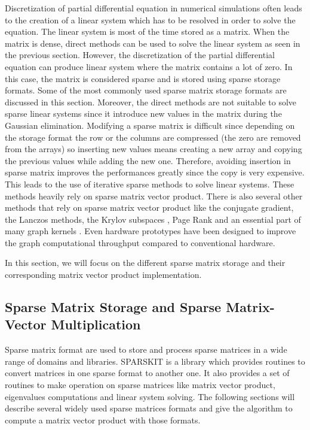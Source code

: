 Discretization of partial differential equation in numerical simulations often leads to the creation of a linear system which has to be resolved in order to solve the equation.
The linear system is most of the time stored as a matrix.
When the matrix is dense, direct methods can be used to solve the linear system as seen in the previous section.
However, the discretization of the partial differential equation can produce linear system where the matrix contains a lot of zero.
In this case, the matrix is considered sparse and is stored using sparse storage formats.
Some of the most commonly used sparse matrix storage formats are discussed in this section.
Moreover, the direct methods are not suitable to solve sparse linear systems since it introduce new values in the matrix during the Gaussian elimination.
Modifying a sparse matrix is difficult since depending on the storage format the row or the columns are compressed (the zero are removed from the arrays) so inserting new values means creating a new array and copying the previous values while adding the new one.
Therefore, avoiding insertion in sparse matrix improves the performances greatly since the copy is very expensive.
This leads to the use of iterative sparse methods to solve linear systems.
These methods heavily rely on sparse matrix vector product.
There is also several other methods that rely on sparse matrix vector product like the conjugate gradient, the Lanczos methods, the Krylov subspaces \cite{Saad1989} \cite{Saad2003}, Page Rank \cite{RidiS2002} and an essential part of many graph kernels \cite{KepnG2011}.
Even hardware prototypes \cite{SoGLK2016} have been designed to improve the graph computational throughput compared to conventional hardware.

In this section, we will focus on the different sparse matrix storage and their corresponding matrix vector product implementation.

\subsection{Sparse Matrix Storage and Sparse Matrix-Vector Multiplication}

Sparse matrix format are used to store and process sparse matrices in a wide range of domains and libraries.
SPARSKIT \cite{Saad1990} is a library which provides routines to convert matrices in one sparse format to another one.
It also provides a set of routines to make operation on sparse matrices like matrix vector product, eigenvalues computations and linear system solving.
The following sections will describe several widely used sparse matrices formats and give the algorithm to compute a matrix vector product with those formats.

